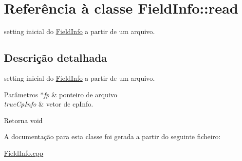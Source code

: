 \hypertarget{class_field_info_1_1read}{}\section{Referência à classe Field\+Info\+:\+:read}
\label{class_field_info_1_1read}


setting inicial do \hyperlink{class_field_info}{Field\+Info} a partir de um arquivo.  




\subsection{Descrição detalhada}
setting inicial do \hyperlink{class_field_info}{Field\+Info} a partir de um arquivo. 


\begin{DoxyParams}{Parâmetros}
{\em $\ast$fp} & ponteiro de arquivo \\
\hline
{\em true\+Cp\+Info} & vetor de cp\+Info. \\
\hline
\end{DoxyParams}
\begin{DoxyReturn}{Retorna}
void 
\end{DoxyReturn}


A documentação para esta classe foi gerada a partir do seguinte ficheiro\+:\begin{DoxyCompactItemize}
\item 
\hyperlink{_field_info_8cpp}{Field\+Info.\+cpp}\end{DoxyCompactItemize}
